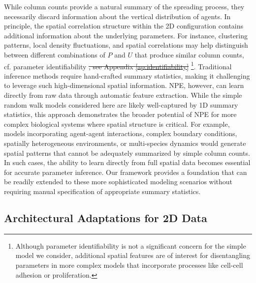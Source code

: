 \documentclass{article}
\makeatletter
\providecommand{\DIFdeltex}[1]{{\protect\color{red}\sout{#1}}} %
\providecommand{\DIFdelbegin}{} %
\providecommand{\DIFdelend}{} %
\providecommand{\DIFdel}[1]{\texorpdfstring{\DIFdeltex{#1}}{}} %
\newcommand{\DIFscaledelfig}{0.5}
\newlength{\DIFdelgraphicswidth} %
\newlength{\DIFdelgraphicsheight} %
\newcommand{\DIFdelincludegraphics}[2][]{%
\sbox{\DIFdelgraphicsbox}{\DIFOincludegraphics[#1]{#2}}%
\settoboxwidth{\DIFdelgraphicswidth}{\DIFdelgraphicsbox} %
\settoboxtotalheight{\DIFdelgraphicsheight}{\DIFdelgraphicsbox} %
\scalebox{\DIFscaledelfig}{%
\parbox[b]{\DIFdelgraphicswidth}{\usebox{\DIFdelgraphicsbox}\\[-\baselineskip] \rule{\DIFdelgraphicswidth}{0em}}\llap{\resizebox{\DIFdelgraphicswidth}{\DIFdelgraphicsheight}{%
\setlength{\unitlength}{\DIFdelgraphicswidth}%
\begin{picture}(1,1)%
\thicklines\linethickness{2pt} %
{\color[rgb]{1,0,0}\put(0,0){\framebox(1,1){}}}%
{\color[rgb]{1,0,0}\put(0,0){\line( 1,1){1}}}%
{\color[rgb]{1,0,0}\put(0,1){\line(1,-1){1}}}%
\end{picture}%
}\hspace*{3pt}}} %
} %
\DeclareRobustCommand{\DIFdelbegin}{\DIFOdelbegin \let\includegraphics\DIFdelincludegraphics} %
\DeclareRobustCommand{\DIFdelend}{\DIFOaddend \let\includegraphics\DIFOincludegraphics} %
\let\sout@orig\sout %
\renewcommand{\sout}[1]{\ifmmode\text{\sout@orig{\ensuremath{#1}}}\else\sout@orig{#1}\fi} %
\makeatother
\begin{document}
\DIFdelend While column counts provide a natural summary of the spreading process, they necessarily discard information about the vertical distribution of agents. In principle, the spatial correlation structure within the 2D configuration contains additional information about the underlying parameters. For instance, clustering patterns, local density fluctuations, and spatial correlations may help distinguish between different combinations of $P$ and $U$ that produce similar column counts, cf. parameter identifiability \DIFdelbegin \DIFdel{, see Appendix \ref{ap:identifiability} }\DIFdelend \footnote{Although parameter identifiability is not a significant concern for the simple model we consider, additional spatial features are of interest for disentangling parameters in more complex models that incorporate processes like cell-cell adhesion or proliferation.}. Traditional inference methods require hand-crafted summary statistics, making it challenging to leverage such high-dimensional spatial information. NPE, however, can learn directly from raw data through automatic feature extraction. While the simple random walk models considered here are likely well-captured by 1D summary statistics, this approach demonstrates the broader potential of NPE for more complex biological systems where spatial structure is critical. For example, models incorporating agent-agent interactions, complex boundary conditions, spatially heterogeneous environments, or multi-species dynamics would generate spatial patterns that cannot be adequately summarized by simple column counts. In such cases, the ability to learn directly from full spatial data becomes essential for accurate parameter inference. Our framework provides a foundation that can be readily extended to these more sophisticated modeling scenarios without requiring manual specification of appropriate summary statistics.

\subsection{Architectural Adaptations for 2D Data}
\end{document}
